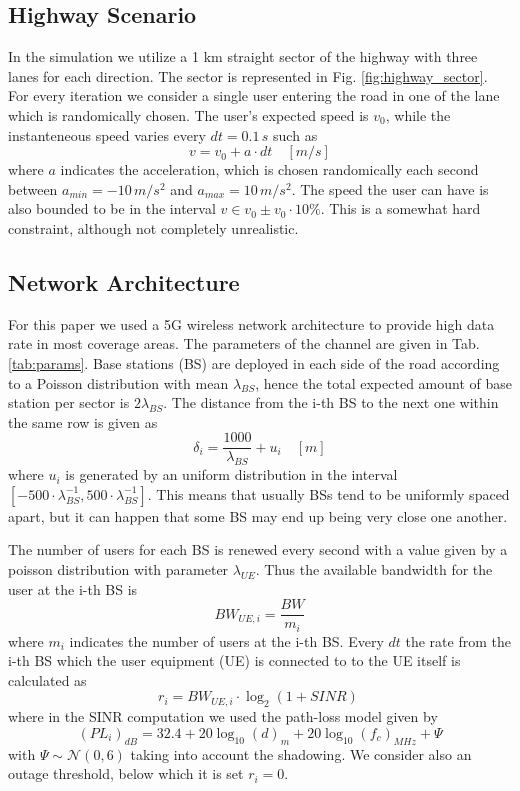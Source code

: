 \documentclass[conference,10pt]{IEEEtran}
\begin{document}
\subsection{Highway Scenario}
In the simulation we utilize a 1 km straight sector of the highway with three lanes for each direction. The sector is represented in Fig. \ref{fig:highway_sector}. For every iteration we consider a single user entering the road in one of the lane which is randomically chosen. The user's expected speed is $v_0$, while the instanteneous speed varies every $dt = 0.1\, s$ such as
\begin{equation}
	\label{eq:speed}
	v = v_0+a\cdot dt \quad [m\!/\!s]
\end{equation}
where $a$ indicates the acceleration, which is chosen randomically each second between $a_{min}=-10\,m\!/\!s^2$ and $a_{max}=10\,m\!/\!s^2$. The speed the user can have is also bounded to be in the interval $v \in v_0 \pm v_0 \cdot 10\%$. This is a somewhat hard constraint, although not completely unrealistic.

\subsection{Network Architecture}
For this paper we used a 5G wireless network architecture to provide high data rate in most coverage areas. The parameters of the channel are given in Tab.\ref{tab:params}. Base stations (BS) are deployed in each side of the road according to a Poisson distribution with mean $\lambda_{BS}$, hence the total expected amount of base station per sector is $2\lambda_{BS}$. The distance from the i-th BS to the next one within the same row is given as
\begin{equation}
	\label{eq:distance}
	\delta_i = \frac{1000}{\lambda_{BS}}+u_i \quad [m]
\end{equation}
where $u_i$ is generated by an uniform distribution in the interval $[-500\cdot\lambda_{BS}^{-1},500\cdot\lambda_{BS}^{-1}]$. This means that usually BSs tend to be uniformly spaced apart, but it can happen that some BS may end up being very close one another.  

The number of users for each BS is renewed every second with a value given by a poisson distribution with parameter $\lambda_{U\!E}$. Thus the available bandwidth for the user at the i-th BS is
\begin{equation}
	\label{bandwidth}
	BW_{U\!E,i} = \frac{BW}{m_i}
\end{equation}
where $m_i$ indicates the number of users at the i-th BS.
Every $dt$ the rate from the i-th BS which the user equipment (UE) is connected to to the UE itself is calculated as
\begin{equation}
	\label{eq:rate}
	r_i = BW_{U\!E,i}\cdot\log_2(1+SINR) \	
\end{equation}
where in the SINR computation we used the path-loss model given by
\begin{equation}
	(PL_i)_{dB} = 32.4+20\log_{10}(d)_m+20\log_{10}(f_c)_{M\!H\!z}+\Psi
\end{equation}
with $\Psi\sim \mathcal{N}(0,6)$ taking into account the shadowing. We consider also an outage threshold, below which it is set $r_i = 0$.
\end{document}
